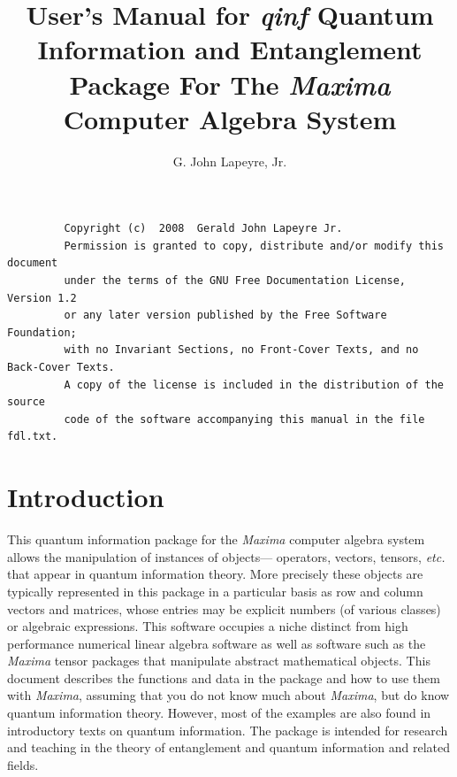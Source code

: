\documentclass[leqno,10pt]{article}
\newcommand{\pname}[1]{{\it #1}} %
\newcommand{\qinf}{ {\it qinf } } %
\begin{document}
\title{User's Manual for \qinf Quantum Information and Entanglement Package For The \pname{Maxima} Computer
  Algebra System}
\author{G. John Lapeyre, Jr.}

\maketitle

\begin{verbatim}
         Copyright (c)  2008  Gerald John Lapeyre Jr.
         Permission is granted to copy, distribute and/or modify this document
         under the terms of the GNU Free Documentation License, Version 1.2
         or any later version published by the Free Software Foundation;
         with no Invariant Sections, no Front-Cover Texts, and no Back-Cover Texts.
         A copy of the license is included in the distribution of the source
         code of the software accompanying this manual in the file fdl.txt.
\end{verbatim}

\tableofcontents

\section{Introduction}

This quantum information package for the \pname{Maxima} computer
algebra system allows the manipulation of instances of
objects--- operators, vectors, tensors, {\it etc.}  that
appear in quantum information theory.  More precisely these
objects are typically represented in this package in a
particular basis as row and column vectors and matrices,
whose entries may be explicit numbers (of various classes)
or algebraic expressions. This software occupies a niche
distinct from high performance numerical linear algebra
software as well as software such as the \pname{Maxima} tensor
packages that manipulate abstract mathematical objects.
This document describes the functions and data in the
package and how to use them with \pname{Maxima}, assuming that you
do not know much about \pname{Maxima}, but do know quantum
information theory. However, most of the examples are also
found in introductory texts on quantum information.  The
package is intended for research and teaching in the theory
of entanglement and quantum information and related fields.
\end{document}
